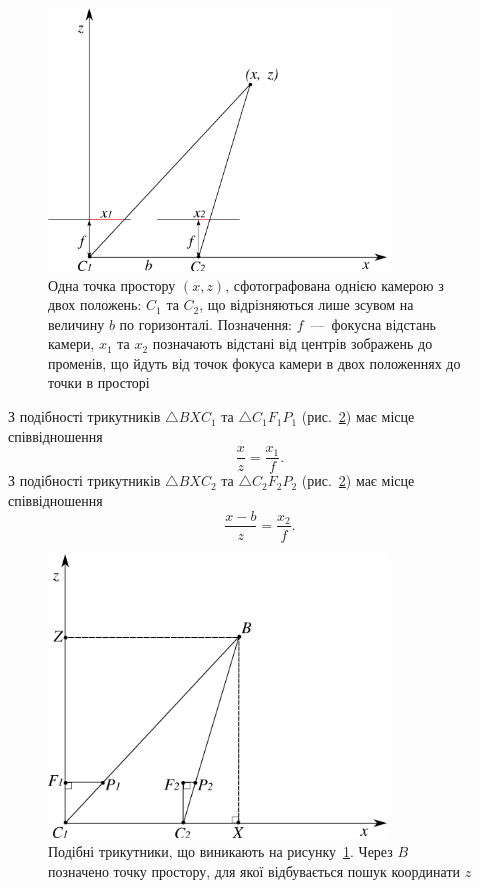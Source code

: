 \begin{figure}[h]
  \centering
  \includegraphics[width=0.8\textwidth]{images/2d_geometry}
  \caption{Одна точка простору $\left(x, z \right)$,
           сфотографована однією камерою з двох положень: $C_1$ та $C_2$,
           що відрізняються лише зсувом на величину $b$ по горизонталі.
           Позначення: $f$~---~фокусна відстань камери,
           $x_1$ та $x_2$ позначають відстані від центрів зображень до променів,
           що йдуть від точок фокуса камери в двох положеннях до точки
           в просторі}
  \label{fig:geometry}
\end{figure}

З подібності трикутників $\triangle BXC_1$ та $\triangle C_1 F_1 P_1$
(рис.~\ref{fig:triangles}) має місце співвідношення
\begin{equation} \label{eq:triangle:1}
    \frac{x}{z} = \frac{x_1}{f}.
\end{equation}
З подібності трикутників $\triangle BXC_2$ та $\triangle C_2 F_2 P_2$
(рис.~\ref{fig:triangles}) має місце співвідношення
\begin{equation} \label{eq:triangle:2}
    \frac{x - b}{z} = \frac{x_2}{f}.
\end{equation}

\begin{figure}[h]
  \centering
  \includegraphics[width=0.8\textwidth]{images/2d_triangles}
  \caption{Подібні трикутники, що виникають на рисунку~\ref{fig:geometry}.
           Через $B$ позначено точку простору,
           для якої відбувається пошук координати $z$}
  \label{fig:triangles}
\end{figure}

